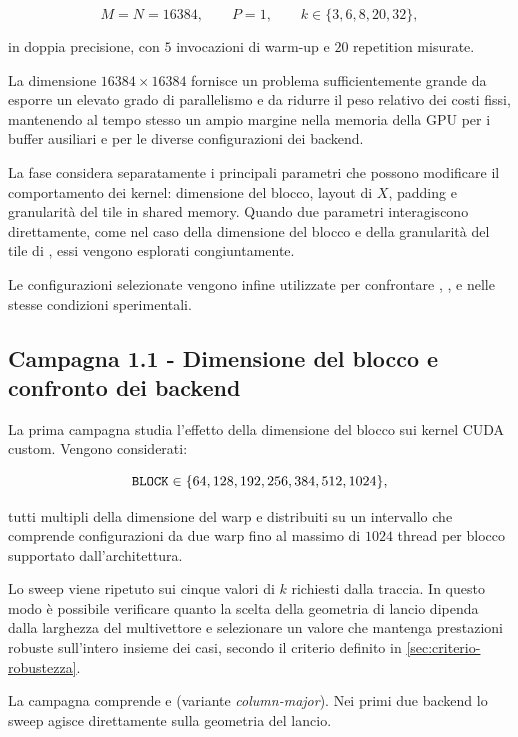 \[
M=N=\num{16384},
\qquad
P=1,
\qquad
k\in\{3,6,8,20,32\},
\]

in doppia precisione, con $5$ invocazioni di warm-up e $20$ repetition
misurate.

La dimensione $\num{16384}\times\num{16384}$ fornisce un problema
sufficientemente grande da esporre 
un elevato grado di parallelismo e da
ridurre il peso relativo dei costi fissi, mantenendo al tempo stesso un
ampio margine nella memoria della GPU per i buffer ausiliari e per le
diverse configurazioni dei backend.

La fase considera separatamente i principali parametri che possono
modificare il comportamento dei kernel: dimensione del blocco, layout di
$X$, padding e granularità del tile in shared memory. Quando due
parametri interagiscono direttamente, come nel caso della dimensione del
blocco e della granularità del tile di
, essi vengono esplorati congiuntamente.

Le configurazioni selezionate vengono infine utilizzate per confrontare
, ,
 e  nelle stesse condizioni
sperimentali.

\subsection{Campagna 1.1 - Dimensione del blocco e confronto dei backend}
\label{sec:camp-block}

La prima campagna studia l'effetto della dimensione del blocco sui kernel
CUDA custom. Vengono considerati:

\[
\texttt{BLOCK}
\in
\{64,128,192,256,384,512,1024\},
\]

tutti multipli della dimensione del warp e distribuiti su un intervallo
che comprende configurazioni da due warp fino al massimo di $1024$ thread
per blocco supportato dall'architettura.

Lo sweep viene ripetuto sui cinque valori di $k$ richiesti dalla traccia.
In questo modo è possibile verificare quanto la scelta della geometria di
lancio dipenda dalla larghezza del multivettore e selezionare un valore che
mantenga prestazioni robuste sull'intero insieme dei casi, secondo il
criterio definito in \cref{sec:criterio-robustezza}.

La campagna comprende  e  (variante \emph{column-major}).
Nei primi due
backend lo sweep agisce direttamente sulla geometria del lancio.

